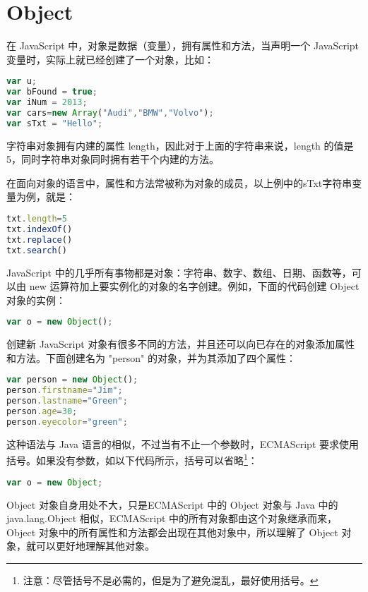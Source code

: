 \section{Object}

在 JavaScript 中，对象是数据（变量），拥有属性和方法，当声明一个 JavaScript 变量时，实际上就已经创建了一个对象，比如：

\begin{lstlisting}[language=JavaScript]
var u;
var bFound = true;
var iNum = 2013;
var cars=new Array("Audi","BMW","Volvo");
var sTxt = "Hello";
\end{lstlisting}

字符串对象拥有内建的属性 length，因此对于上面的字符串来说，length 的值是 5，同时字符串对象同时拥有若干个内建的方法。

在面向对象的语言中，属性和方法常被称为对象的成员，以上例中的sTxt字符串变量为例，就是：

\begin{lstlisting}[language=JavaScript]
txt.length=5
txt.indexOf()
txt.replace()
txt.search()
\end{lstlisting}


JavaScript 中的几乎所有事物都是对象：字符串、数字、数组、日期、函数等，可以由 new 运算符加上要实例化的对象的名字创建。例如，下面的代码创建 Object 对象的实例：


\begin{lstlisting}[language=JavaScript]
var o = new Object();
\end{lstlisting}

创建新 JavaScript 对象有很多不同的方法，并且还可以向已存在的对象添加属性和方法。下面创建名为 "person" 的对象，并为其添加了四个属性：

\begin{lstlisting}[language=JavaScript]
var person = new Object();
person.firstname="Jim";
person.lastname="Green";
person.age=30;
person.eyecolor="green";
\end{lstlisting}



这种语法与 Java 语言的相似，不过当有不止一个参数时，ECMAScript 要求使用括号。如果没有参数，如以下代码所示，括号可以省略\footnote{注意：尽管括号不是必需的，但是为了避免混乱，最好使用括号。}：

\begin{lstlisting}[language=JavaScript]
var o = new Object;
\end{lstlisting}

Object 对象自身用处不大，只是ECMAScript 中的 Object 对象与 Java 中的 java.lang.Object 相似，ECMAScript 中的所有对象都由这个对象继承而来，Object 对象中的所有属性和方法都会出现在其他对象中，所以理解了 Object 对象，就可以更好地理解其他对象。

